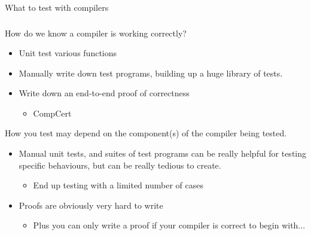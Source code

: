 \documentclass{beamer}
\begin{document}
\begin{frame}
  What to test with compilers

  
\end{frame}

\begin{frame}
  \frametitle{}

  How do we know a compiler is working correctly?

  \begin{itemize}
  \item Unit test various functions
  \item Manually write down test programs, building up a huge library
    of tests.
  \item Write down an end-to-end proof of correctness
    \begin{itemize}
    \item CompCert
    \end{itemize}
  \end{itemize}

  How you test may depend on the component(s) of the compiler being
  tested.


  \pause

  \begin{itemize}
  \item Manual unit tests, and suites of test programs can be really
    helpful for testing specific behaviours, but can be really tedious
    to create.
    \begin{itemize}
    \item End up testing with a limited number of cases
    \end{itemize}
  \item Proofs are obviously very hard to write
    \begin{itemize}
    \item Plus you can only write a proof if your compiler is correct
      to begin with...
    \end{itemize}
  \end{itemize}


\end{frame}
\end{document}
